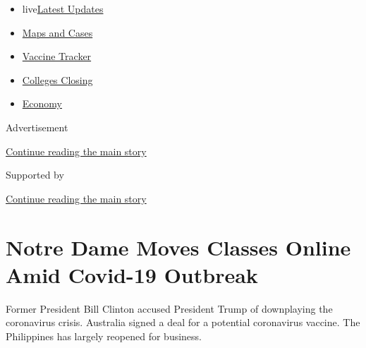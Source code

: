 \begin{itemize}
\tightlist
\item
  live\href{https://www.nytimes3xbfgragh.onion/2020/08/20/world/coronavirus-covid.html?name=styln-coronavirus-national\&region=TOP_BANNER\&variant=undefined\&block=storyline_menu_recirc\&action=click\&pgtype=Article\&impression_id=b1ed59b1-e381-11ea-8f04-cd5180a6ec60}{Latest
  Updates}
\item
  \href{https://www.nytimes3xbfgragh.onion/interactive/2020/us/coronavirus-us-cases.html?name=styln-coronavirus-national\&region=TOP_BANNER\&variant=undefined\&block=storyline_menu_recirc\&action=click\&pgtype=Article\&impression_id=b1ed59b2-e381-11ea-8f04-cd5180a6ec60}{Maps
  and Cases}
\item
  \href{https://www.nytimes3xbfgragh.onion/interactive/2020/science/coronavirus-vaccine-tracker.html?name=styln-coronavirus-national\&region=TOP_BANNER\&variant=undefined\&block=storyline_menu_recirc\&action=click\&pgtype=Article\&impression_id=b1ed59b3-e381-11ea-8f04-cd5180a6ec60}{Vaccine
  Tracker}
\item
  \href{https://www.nytimes3xbfgragh.onion/2020/08/19/us/colleges-closing-covid.html?name=styln-coronavirus-national\&region=TOP_BANNER\&variant=undefined\&block=storyline_menu_recirc\&action=click\&pgtype=Article\&impression_id=b1ed80c0-e381-11ea-8f04-cd5180a6ec60}{Colleges
  Closing}
\item
  \href{https://www.nytimes3xbfgragh.onion/live/2020/08/20/business/stock-market-today-coronavirus?name=styln-coronavirus-national\&region=TOP_BANNER\&variant=undefined\&block=storyline_menu_recirc\&action=click\&pgtype=Article\&impression_id=b1ed80c1-e381-11ea-8f04-cd5180a6ec60}{Economy}
\end{itemize}

Advertisement

\protect\hyperlink{after-top}{Continue reading the main story}

Supported by

\protect\hyperlink{after-sponsor}{Continue reading the main story}

\hypertarget{notre-dame-moves-classes-online-amid-covid-19-outbreak}{%
\section{Notre Dame Moves Classes Online Amid Covid-19
Outbreak}\label{notre-dame-moves-classes-online-amid-covid-19-outbreak}}

Former President Bill Clinton accused President Trump of downplaying the
coronavirus crisis. Australia signed a deal for a potential coronavirus
vaccine. The Philippines has largely reopened for business.

